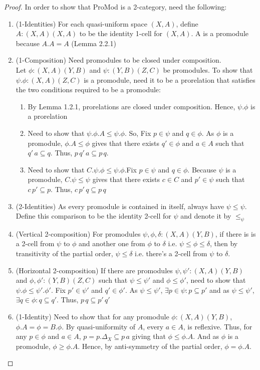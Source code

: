 \documentclass[18pt,a4paper]{article}
\makeatletter
\theoremstyle{definition}
\newcommand{\carrow}{}%
\DeclareRobustCommand{\carrow}{%
	\mathrel{\vphantom{\rightarrow}\mathpalette\circle@arrow\relax}%
}
\newcommand{\circle@arrow}[2]{%
	\m@th
	\ooalign{%
		\hidewidth$#1\circ\mkern1mu$\hidewidth\cr
	$#1\longrightarrow$\cr}%
}
\makeatother
\begin{document}
\begin{proof}\setcounter{equation}{0}
	In order to show that ProMod is a 2-category, need the following:
	\begin{enumerate}[label=(\alph*)]
		\item (1-Identities) For each quasi-uniform space $(X,A)$,
			define $A:(X,A) \carrow (X,A)$ to be the identity 1-cell for $(X,A)$. A is a promodule
			because $A.A=A$ (Lemma 2.2.1)
		\item (1-Composition) Need promodules to be closed under composition.\\
			Let $\phi:(X,A)\carrow (Y,B)$ and $\psi:(Y,B)\carrow (Z,C)$ be promodules.
			To show that $\psi.\phi:(X,A) \carrow (Z,C)$ is a promodule, need it to be a
			prorelation that satisfies the two conditions required to be a promodule:
			\begin{enumerate}[label=(\roman*)]
				\item By Lemma 1.2.1, prorelations are closed under composition.
					Hence, $\psi.\phi$ is a prorelation
				\item Need to show that $\psi.\phi.A \leq \psi.\phi$. So, Fix
					$p \in \psi$ and $q \in \phi$. As $\phi$ is a promodule,
					$\phi.A\leq \phi$ gives that there exists
					$ q' \in \phi \text{ and } a\in A$ such that
					$q'\,a \subseteq q$. Thus,
					$p\,q'\,a \subseteq p\,q$.
				\item Need to show that $C.\psi.\phi \leq \psi.\phi$.Fix $p \in \psi$
					and $q\in \phi$. Because
					$\psi$ is a promodule, $C.\psi \leq \psi$ gives that
					there exists $c\in C$ and $p' \in \psi$ such that
					$c\,p' \subseteq p$. Thus, $c\,p'\,q \subseteq p\,q$
			\end{enumerate}
		\item (2-Identities) As every promodule is contained in itself, always have $\psi \leq \psi$.
			Define this comparison to be the identity 2-cell for $\psi$ and denote it by $\leq_\psi$

		\item (Vertical 2-composition) For promodules $\psi,\phi,\delta:(X,A) \carrow (Y,B)$,
			if there is is a 2-cell from $\psi$ to $\phi$ and another one from $\phi$
			to $\delta$ i.e. $\psi \leq \phi \leq \delta$, then by transitivity
			of the partial order, $\psi \leq \delta$ i.e. there's a 2-cell from
			$\psi$ to $\delta$.
		\item (Horizontal 2-composition) If there are promodules
			$\psi,\psi':(X,A) \carrow (Y,B)$ and
			$\phi,\phi':(Y,B) \carrow (Z,C)$ such that $\psi \leq \psi'$ and $\phi \leq
			\phi'$, need to show that $\psi.\phi \leq \psi'.\phi'$. Fix $p' \in \psi'$ and
			$q' \in \phi'$. As $\psi\leq\psi'$, $\exists p\in \psi: p \subseteq p'$
			and as $\psi\leq\psi'$, $\exists q \in \phi: q \subseteq q'$.
			Thus, $p\,q\subseteq p'\,q'$
		\item (1-Identity) Need to show that for any promodule $\phi:(X,A) \carrow (Y,B)$,
			$\phi.A=\phi=B.\phi$. By quasi-uniformity of $A$, every $a \in A$, is
			reflexive. Thus, for any $p \in \phi$ and $a \in A$,
			$p=p. \Delta_X \subseteq p \,a$
			giving that $\phi \leq \phi.A$. And as $\phi$ is a promodule,
			$\phi \geq \phi.A$. Hence, by anti-symmetry of the partial order, $\phi=\phi.A$.


\end{enumerate}
\end{proof}
\end{document}
